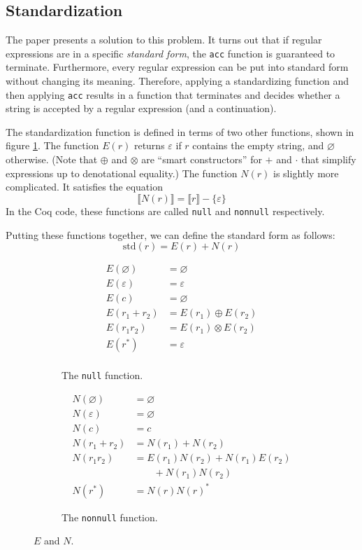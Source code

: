 \documentclass{article}
\newcommand{\coq}[1]{\texttt{#1}}
\begin{document}
\subsection{Standardization}
The paper presents a solution to this problem. It turns out that if regular
expressions are in a specific \emph{standard form}, the \coq{acc} function is
guaranteed to terminate. Furthermore, every regular expression can be put into
standard form without changing its meaning. Therefore, applying a standardizing
function and then applying \coq{acc} results in a function that terminates and
decides whether a string is accepted by a regular expression (and a
continuation).

The standardization function is defined in terms of two other functions, shown
in figure \ref{fig:fns}. The function $E(r)$ returns $\varepsilon$ if $r$
contains the empty string, and $\varnothing$ otherwise. (Note that $\oplus$ and
$\otimes$ are ``smart constructors'' for $+$ and $\cdot$ that simplify
expressions up to denotational equality.) The function $N(r)$ is slightly more
complicated. It satisfies the equation
$$ \llbracket N(r) \rrbracket = \llbracket r \rrbracket - \{\varepsilon\} $$
In the Coq code, these functions are called \coq{null} and \coq{nonnull}
respectively.

Putting these functions together, we can define the standard form as follows:
$$ \text{std}(r) = E(r) + N(r) $$

\begin{figure}
  \centering
  \begin{subfigure}[t]{0.45\linewidth}
    \begin{align*}
      E(\varnothing) &= \varnothing \\
      E(\varepsilon) &= \varepsilon \\
      E(c) &= \varnothing \\
      E(r_1 + r_2) &= E(r_1) \oplus E(r_2) \\
      E(r_1r_2) &= E(r_1) \otimes E(r_2) \\
      E(r^*) &= \varepsilon \\
    \end{align*}
    \caption{The \coq{null} function.}
  \end{subfigure}
  \begin{subfigure}[t]{0.45\linewidth}
    \begin{align*}
      N(\varnothing) &= \varnothing \\
      N(\varepsilon) &= \varnothing \\
      N(c) &= c \\
      N(r_1 + r_2) &= N(r_1) + N(r_2) \\
      N(r_1r_2) &= E(r_1)N(r_2) + N(r_1)E(r_2) \\
                     &\qquad + N(r_1)N(r_2) \\
      N(r^*) &= N(r)N(r)^*
    \end{align*}
    \caption{The \coq{nonnull} function.}
  \end{subfigure}
  \caption{$E$ and $N$.}
  \label{fig:fns}
\end{figure}
\end{document}
